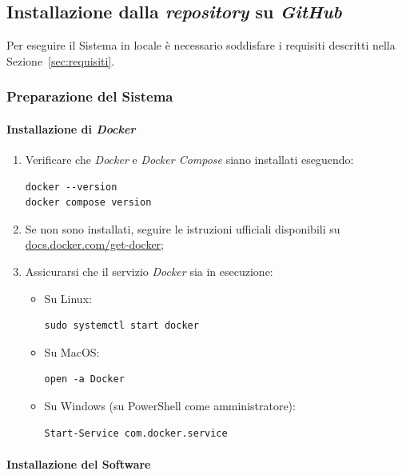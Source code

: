 \documentclass[10pt, letterpaper]{article}
\begin{document}
\subsection{Installazione dalla \textit{repository} su \textit{GitHub}}
\label{sec:installazione-github}

Per eseguire il Sistema in locale è necessario soddisfare i requisiti descritti nella Sezione~\ref{sec:requisiti}.

\subsubsection{Preparazione del Sistema}

\paragraph{Installazione di \textit{Docker}}

\begin{enumerate}
    \item Verificare che \textit{Docker} e \textit{Docker Compose} siano installati eseguendo:
\begin{verbatim}
docker --version
docker compose version
\end{verbatim}
    \item Se non sono installati, seguire le istruzioni ufficiali disponibili su \href{https://docs.docker.com/get-docker/}{docs.docker.com/get-docker};
    \item Assicurarsi che il servizio \textit{Docker} sia in esecuzione:
    \begin{itemize}
      \item Su Linux: \begin{verbatim}sudo systemctl start docker\end{verbatim}
      \item Su MacOS: \begin{verbatim}open -a Docker\end{verbatim}
      \item Su Windows (su PowerShell come amministratore): \begin{verbatim}Start-Service com.docker.service\end{verbatim}
\end{itemize}
\end{enumerate}

\paragraph{Installazione del Software}
\end{document}
